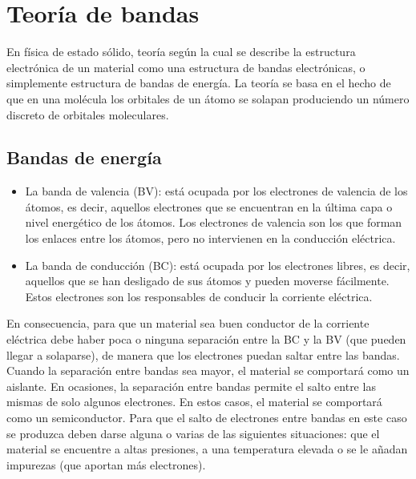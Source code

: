 \documentclass{article}
\author{Pablo Vivar Colina A7\\
Grupo 5 Tarea 7
}
\begin{document}
\maketitle

\section{Teoría de bandas}

En física de estado sólido, teoría según la cual se describe la estructura electrónica de un material como una estructura de bandas electrónicas, o simplemente estructura de bandas de energía. La teoría se basa en el hecho de que en una molécula los orbitales de un átomo se solapan produciendo un número discreto de orbitales moleculares.\citep{TeorB}\\

 \subsection{Bandas de energía}
 
 \begin{itemize}
    
     \item La banda de valencia (BV): está ocupada por los electrones de valencia de los átomos, es decir, aquellos electrones que se encuentran en la última capa o nivel energético de los átomos. Los electrones de valencia son los que forman los enlaces entre los átomos, pero no intervienen en la conducción eléctrica.
     \citep{TeorB}
     \item  La banda de conducción (BC): está ocupada por los electrones libres, es decir, aquellos que se han desligado de sus átomos y pueden moverse fácilmente. Estos electrones son los responsables de conducir la corriente eléctrica.
     \citep{TeorB}

 \end{itemize}
 
 En consecuencia, para que un material sea buen conductor de la corriente eléctrica debe haber poca o ninguna separación entre la BC y la BV (que pueden llegar a solaparse), de manera que los electrones puedan saltar entre las bandas. Cuando la separación entre bandas sea mayor, el material se comportará como un aislante. En ocasiones, la separación entre bandas permite el salto entre las mismas de solo algunos electrones. En estos casos, el material se comportará como un semiconductor. Para que el salto de electrones entre bandas en este caso se produzca deben darse alguna o varias de las siguientes situaciones: que el material se encuentre a altas presiones, a una temperatura elevada o se le añadan impurezas (que aportan más electrones).\citep{TeorB}
\end{document}
